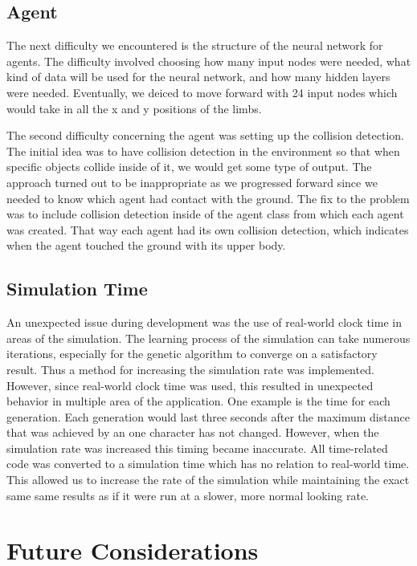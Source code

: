 \documentclass[letterpaper]{article} %
\begin{document}
\subsection{Agent}

The next difficulty we encountered is the structure of the neural network for agents. The difficulty involved choosing how many input nodes were needed, what kind of data will be used for the neural network, and how many hidden layers were needed. Eventually, we deiced to move forward with 24 input nodes which would take in all the x and y positions of the limbs. 

\par The second difficulty concerning the agent was setting up the collision detection. The initial idea was to have collision detection in the environment so that when specific objects collide inside of it, we would get some type of output. The approach turned out to be inappropriate as we progressed forward since we needed to know which agent had contact with the ground. The fix to the problem was to include collision detection inside of the agent class from which each agent was created. That way each agent had its own collision detection, which indicates when the agent touched the ground with its upper body.

\subsection{Simulation Time}

\par An unexpected issue during development was the use of real-world clock time in areas of the simulation. The learning process of the simulation can take numerous iterations, especially for the genetic algorithm to converge on a satisfactory result. Thus a method for increasing the simulation rate was implemented. However, since real-world clock time was used, this resulted in unexpected behavior in multiple area of the application. One example is the time for each generation. Each generation would last three seconds after the maximum distance that was achieved by an one character has not changed. However, when the simulation rate was increased this timing became inaccurate. All time-related code was converted to a simulation time which has no relation to real-world time. This allowed us to increase the rate of the simulation while maintaining the exact same same results as if it were run at a slower, more normal looking rate.

\section{Future Considerations}
\end{document}

